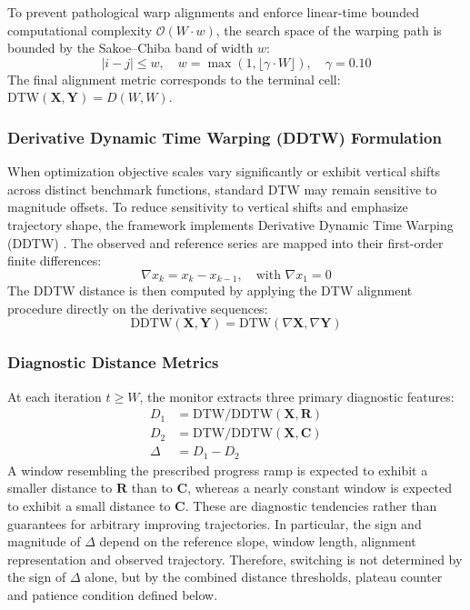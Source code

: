 \documentclass[review]{elsarticle}
\begin{document}
To prevent pathological warp alignments and enforce linear-time bounded computational complexity $\mathcal{O}(W \cdot w)$, the search space of the warping path is bounded by the Sakoe--Chiba band of width $w$:
\begin{equation}
|i - j| \le w, \quad w = \max(1, \lfloor \gamma \cdot W \rfloor), \quad \gamma = 0.10
\label{eq:sakoe_chiba}
\end{equation}
The final alignment metric corresponds to the terminal cell: $\text{DTW}(\mathbf{X}, \mathbf{Y}) = D(W, W)$.

\subsubsection{Derivative Dynamic Time Warping (DDTW) Formulation}

When optimization objective scales vary significantly or exhibit vertical shifts across distinct benchmark functions, standard DTW may remain sensitive to magnitude offsets. To reduce sensitivity to vertical shifts and emphasize trajectory shape, the framework implements Derivative Dynamic Time Warping (DDTW) \cite{keogh2001derivative}. The observed and reference series are mapped into their first-order finite differences:
\begin{equation}
\nabla x_k = x_k - x_{k-1}, \quad \text{with } \nabla x_1 = 0
\label{eq:derivative_transform}
\end{equation}
The DDTW distance is then computed by applying the DTW alignment procedure directly on the derivative sequences:
\begin{equation}
\text{DDTW}(\mathbf{X}, \mathbf{Y}) = \text{DTW}(\nabla \mathbf{X}, \nabla \mathbf{Y})
\label{eq:ddtw_metric}
\end{equation}

\subsubsection{Diagnostic Distance Metrics}

At each iteration $t \ge W$, the monitor extracts three primary diagnostic features:
\begin{align}
D_1 &= \text{DTW/DDTW}(\mathbf{X}, \mathbf{R}) \label{eq:d1_dist} \\
D_2 &= \text{DTW/DDTW}(\mathbf{X}, \mathbf{C}) \label{eq:d2_dist} \\
\Delta &= D_1 - D_2 \label{eq:delta_metric}
\end{align}
A window resembling the prescribed progress ramp is expected to exhibit a smaller distance to $\mathbf{R}$ than to $\mathbf{C}$, whereas a nearly constant window is expected to exhibit a small distance to $\mathbf{C}$. These are diagnostic tendencies rather than guarantees for arbitrary improving trajectories. In particular, the sign and magnitude of $\Delta$ depend on the reference slope, window length, alignment representation and observed trajectory. Therefore, switching is not determined by the sign of $\Delta$ alone, but by the combined distance thresholds, plateau counter and patience condition defined below.
\end{document}
